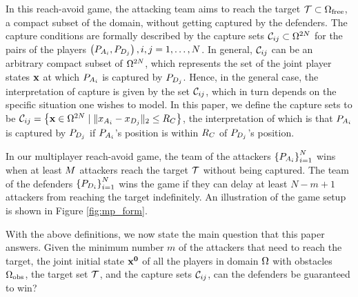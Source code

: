 In this reach-avoid game, the attacking team aims to reach the target $\mathcal{T}\subset\Omega_{\text{free}}$, a compact subset of the domain, without getting captured by the defenders. 
The capture conditions are formally described by the capture sets $\mathcal{C}_{ij}\subset\Omega^{2N}$ for the pairs of the players $\left(P_{A_{i}},P_{D_{j}}\right),i,j=1,\ldots,N$. In general, $\mathcal{C}_{ij}$ can be an arbitrary compact subset of $\Omega^{2N}$, which represents the set of the joint player states $\mathbf{x}$ at which $P_{A_{i}}$ is captured by $P_{D_{j}}$. Hence, in the general case, the interpretation of capture is given by the set $\mathcal{C}_{ij}$, which in turn depends on the specific situation one wishes to model. In this paper, we define the capture sets to be $\mathcal{C}_{ij} = \left\{\mathbf{x}\in\Omega^{2N} \mid \|x_{A_{i}}-x_{D_{j}}\|_2\le R_C \right\}$, the interpretation of which is that $P_{A_{i}}$ is captured by $P_{D_{j}}$ if $P_{A_{i}}$'s position is within $R_C$ of $P_{D_{j}}$'s position. 


%

In our multiplayer reach-avoid game, the team of the attackers $\left\{P_{A_{i}}\right\}_{i=1}^N$ wins when at least $M$ attackers reach the target $\mathcal{T}$ without being captured. The team of the defenders $\left\{P_{D_{i}}\right\}_{i=1}^N$ wins the game if they can delay at least $N-m+1$ attackers from reaching the target indefinitely. An illustration of the game setup is shown in Figure \ref{fig:mp_form}.

With the above definitions, we now state the main question that this paper answers. Given the minimum number $m$ of the attackers that need to reach the target, the joint initial state $\mathbf{x^0}$ of all the players in domain $\Omega$ with obstacles $\Omega_{\text{obs}}$, the target set $\mathcal{T}$, and the capture sets $\mathcal{C}_{ij}$, can the defenders be guaranteed to win?